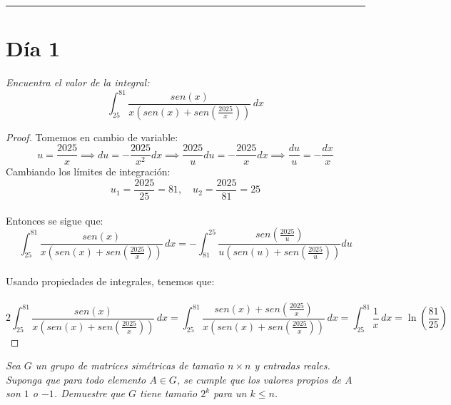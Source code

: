 \documentclass[11pt]{article}
\begin{document}
\rule{17cm}{0.1mm}
\section*{D\'ia 1}
\begin{tcolorbox}[title = \textcolor{black}{\textcolor{white}{Problema 1}}]
\textit{Encuentra el valor de la integral:\,\\
\begin{equation*}
    \int_{25}^{81}\frac{sen(x)}{x\left(sen(x)+sen\left(\frac{2025}{x}\right)\right)}\,dx
\end{equation*}}
\end{tcolorbox}
\begin{proof}
    Tomemos en cambio de variable:\,\\
    \[
        \boxed{u=\frac{2025}{x}\implies du=-\frac{2025}{x^2}dx\implies\frac{2025}{u}du=-\frac{2025}{x}dx\implies\frac{du}{u}=-\frac{dx}{x}}  \]
        Cambiando los l\'imites de integraci\'on:\,\\
        \[
        \boxed{u_1=\frac{2025}{25}=81,\quad u_2=\frac{2025}{81}=25}
        \]
        \,\\
        Entonces se sigue que:\,\\
      \begin{equation*}
        \int_{25}^{81}\frac{sen(x)}{x\left(sen(x)+sen\left(\frac{2025}{x}\right)\right)}\,dx =- \int_{81}^{25}\frac{sen\left(\frac{2025}{u}\right)}{u\left(sen(u)+sen\left(\frac{2025}{u}\right)\right)}du
      \end{equation*}\,\\
      Usando propiedades de integrales, tenemos que:\,\\
      \,\\
      \begin{equation*}
        2\int_{25}^{81}\frac{sen(x)}{x\left(sen(x)+sen\left(\frac{2025}{x}\right)\right)}\,dx = \int_{25}^{81}\frac{sen(x)+sen\left(\frac{2025}{x}\right)}{x\left(sen(x)+sen\left(\frac{2025}{x}\right)\right)}\,dx =\int_{25}^{81}\frac{1}{x}\,dx=\ln\left(\frac{81}{25}\right)
      \end{equation*}
    \end{proof}
    \newpage
    \begin{tcolorbox}[title = \textcolor{black}{\textcolor{white}{Problema 3}}]
\textit{Sea $G$ un grupo de matrices sim\'etricas de tamaño $n\times n$ y entradas reales. Suponga que para todo elemento $A\in G$, se cumple que los valores propios de $A$ son $1$ o $-1$. Demuestre que $G$ tiene tamaño $2^k$ para un $k\leq n$.}
\end{tcolorbox}
\end{document}
